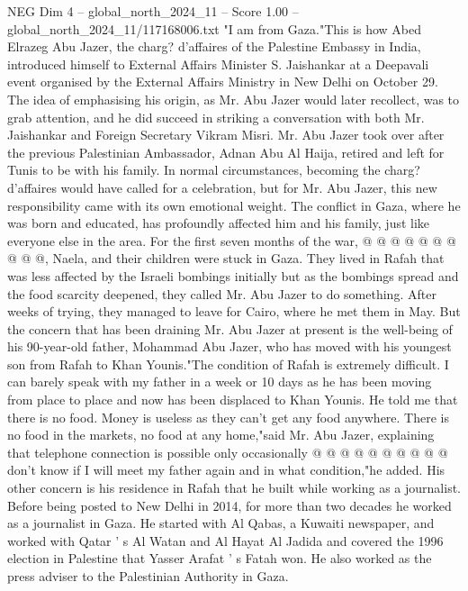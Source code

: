 \begin{textsample}{NEG Dim 4 – global\_north\_2024\_11 – Score 1.00 – global\_north\_2024\_11/117168006.txt}  \label{ex:f4_neg_179}
"I am from Gaza."This is how Abed Elrazeg Abu Jazer, the charg? d'affaires of the Palestine Embassy in India, introduced himself to External Affairs Minister S.
Jaishankar at a Deepavali event organised by the External Affairs Ministry in New Delhi on October 29.
The idea of emphasising his origin, as Mr.
Abu Jazer would later recollect, was to grab attention, and he did succeed in striking a conversation with both Mr.
Jaishankar and Foreign Secretary Vikram Misri.
Mr.
Abu Jazer took over after the previous Palestinian Ambassador, Adnan Abu Al Haija, retired and left for Tunis to be with his family.
In normal circumstances, becoming the charg? d'affaires would have called for a celebration, but for Mr.
Abu Jazer, this new responsibility came with its own emotional weight.
The conflict in Gaza, where he was born and educated, has profoundly affected him and his family, just like everyone else in the area.
For the first seven months of the war, @ @ @ @ @ @ @ @ @ @, Naela, and their children were stuck in Gaza.
They lived in Rafah that was less affected by the Israeli bombings initially but as the bombings spread and the food scarcity deepened, they called Mr.
Abu Jazer to do something.
After weeks of trying, they managed to leave for Cairo, where he met them in May.
But the concern that has been draining Mr.
Abu Jazer at present is the well-being of his 90-year-old father, Mohammad Abu Jazer, who has moved with his youngest son from Rafah to Khan Younis."The condition of Rafah is extremely difficult.
I can barely speak with my father in a week or 10 days as he has been moving from place to place and now has been displaced to Khan Younis.
He told me that there is no food.
Money is useless as they can't get any food anywhere.
There is no food in the markets, no food at any home,"said Mr.
Abu Jazer, explaining that telephone connection is possible only occasionally @ @ @ @ @ @ @ @ @ @ don't know if I will meet my father again and in what condition,"he added.
His other concern is his residence in Rafah that he built while working as a journalist.
Before being posted to New Delhi in 2014, for more than two decades he worked as a journalist in Gaza.
He started with Al Qabas, a Kuwaiti newspaper, and worked with Qatar ' s Al Watan and Al Hayat Al Jadida and covered the 1996 election in Palestine that Yasser Arafat ' s Fatah won.
He also worked as the press adviser to the Palestinian Authority in Gaza.

\end{textsample}
